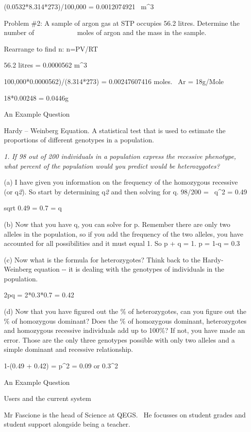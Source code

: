 \documentclass{article}
\begin{document}
(0.0532*8.314*273)/100,000 = 0.0012074921 \ m\^{}3

Problem \#2: A sample of argon gas at STP occupies 56.2 litres. Determine the number of \ \ \ \ \ \ \ \ \ \ \ \ moles of argon and the mass in the sample.

Rearrange to find n: n=PV/RT

56.2 litres = 0.0000562 m\^{}3

100,000*0.0000562)/(8.314*273) = 0.00247607416 moles. \ Ar = 18g/Mole

18*0.00248 = 0.0446g

An Example Question

Hardy -- Weinberg Equation. A statistical test that is used to estimate the proportions of different genotypes in a population.

\emph{1. If 98 out of 200 individuals in a population express the recessive phenotype, what percent of the population would you predict would be heterozygotes?}

(a) I have given you information on the frequency of the homozygous recessive (or q\emph{2}). So start by determining q\emph{2} and then solving for q. 98/200 = \ q\^{}2 = 0.49

sqrt 0.49 = 0.7 = q

(b) Now that you have q, you can solve for p. Remember there are only two alleles in the population, so if you add the frequency of the two alleles, you have accounted for all possibilities and it must equal 1. So p + q = 1. p = 1-q = 0.3

(c) Now what is the formula for heterozygotes? Think back to the Hardy-Weinberg equation -{}- it is dealing with the genotypes of individuals in the population.

2pq = 2*0.3*0.7 = 0.42

(d) Now that you have figured out the \% of heterozygotes, can you figure out the \% of homozygous dominant? Does the \% of homozygous dominant, heterozygotes and homozygous recessive individuals add up to 100\%? If not, you have made an error. Those are the only three genotypes possible with only two alleles and a simple dominant and recessive relationship.

1-(0.49 + 0.42) = p\^{}2 = 0.09 or 0.3\^{}2

An Example Question

Users and the current system

Mr Fascione is the head of Science at QEGS. \ He focusses on student grades and student support alongside being a teacher.
\end{document}
